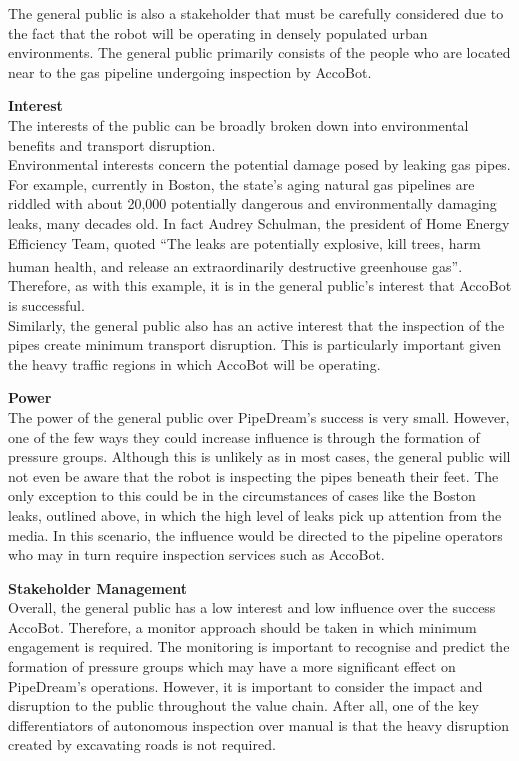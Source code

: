 \documentclass[11pt]{article}		%
\newcommand{\supercite}[1]{\textsuperscript{\cite{#1}}}		%
\begin{document}
			The general public is also a stakeholder that must be carefully considered due to the fact that the robot will be operating in densely populated urban environments. The general public primarily consists of the people who are located near to the gas pipeline undergoing inspection by AccoBot.
			
			\textbf{Interest}
			\\
	        The interests of the public can be broadly broken down into environmental benefits and transport disruption.
	        \\
		    \hspace*{2ex}Environmental interests concern the potential damage posed by leaking gas pipes. For example, currently in Boston, the state’s aging natural gas pipelines are riddled with about 20,000 potentially dangerous and environmentally damaging leaks, many decades old. In fact Audrey Schulman, the president of Home Energy Efficiency Team, quoted  “The leaks are potentially explosive, kill trees, harm human health, and release an extraordinarily destructive greenhouse gas”\supercite{leaks}. Therefore, as with this example, it is in the general public's interest that AccoBot is successful.
		    \\
	        \hspace*{2ex}Similarly, the general public also has an active interest that the inspection of the pipes create minimum transport disruption. This is particularly important given the heavy traffic regions in which AccoBot will be operating. 
	        
	        \textbf{Power}
	        \\
	        The power of the general public over PipeDream's success is very small. However, one of the few ways they could increase influence is through the formation of pressure groups. Although this is unlikely as in most cases, the general public will not even be aware that the robot is inspecting the pipes beneath their feet. The only exception to this could be in the circumstances of cases like the Boston leaks, outlined above, in which the high level of leaks pick up attention from the media. In this scenario, the influence would be directed to the pipeline operators who may in turn require inspection services such as AccoBot.
	        
	        \textbf{Stakeholder Management}
	        \\
	        Overall, the general public has a low interest and low influence over the success AccoBot. Therefore, a monitor approach should be taken in which minimum engagement is required. The monitoring is important to recognise and predict the formation of pressure groups which may have a more significant effect on PipeDream's operations. However, it is important to consider the impact and disruption to the public throughout the value chain. After all, one of the key differentiators of autonomous inspection over manual is that the heavy disruption created by excavating roads is not required.
        	
\end{document}
